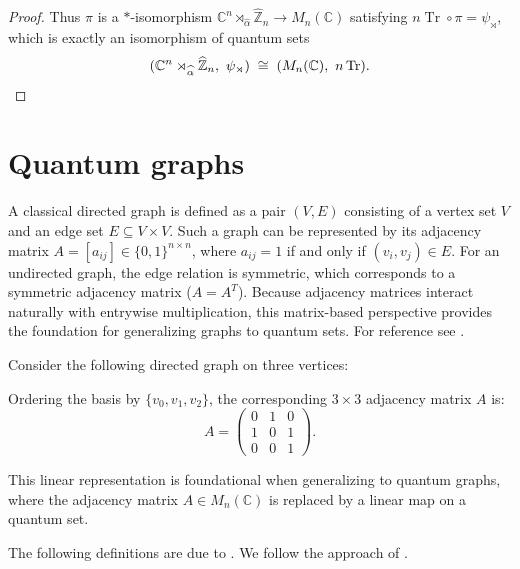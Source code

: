 \begin{proof}
    Thus \( \pi \) is a \( * \)-isomorphism
    \( \mathbb{C}^n\rtimes_{\widehat\alpha}\widehat{\mathbb{Z}}_n \to
    M_n (\mathbb{C}) \)
    satisfying \( n\operatorname{Tr}\circ\pi = \psi_\rtimes \), which is
    exactly an isomorphism of quantum sets
    \[
        (\mathbb{C}^n \rtimes_{\widehat\alpha}
        \widehat{\mathbb{Z}}_n,\ \psi_\rtimes)
        \;\cong\; (M_n (\mathbb{C}),\ n\operatorname{Tr}). \qedhere
    \]
\end{proof}

\section{Quantum graphs}
\label{sec:quantum-graphs}

A classical directed graph is defined as a pair \( (V, E) \)
consisting of a vertex set \( V \) and an edge set \( E \subseteq V
\times V \). Such a graph can be represented by its adjacency matrix
\( A = [a_{ij}] \in \{0, 1\}^{n \times n} \), where \( a_{ij} = 1 \)
if and only if \( (v_i, v_j) \in E \). For an undirected graph, the
edge relation is symmetric, which corresponds to a symmetric
adjacency matrix (\( A = A^T \)). Because adjacency matrices interact
naturally with entrywise multiplication, this matrix-based
perspective provides the foundation for generalizing graphs to quantum sets.
For reference see \textcite{diestel25}.

\begin{example}
    \label{ex:adj-matrix}
    Consider the following directed graph on three vertices:

    

    Ordering the basis by \( \{v_0, v_1, v_2\} \), the corresponding
    \( 3 \times 3 \) adjacency matrix \( A \) is:
    \[
        A =
        \begin{pmatrix}
            0 & 1 & 0 \\
            1 & 0 & 1 \\
            0 & 0 & 1
        \end{pmatrix}.
    \]

    This linear representation is foundational when generalizing to
    quantum graphs, where the adjacency matrix \( A \in
    M_n(\mathbb{C}) \) is replaced by a linear map on a quantum set.
\end{example}

The following definitions are due to \textcite{musto18}. We follow
the approach of \textcite{tobolski26}.

